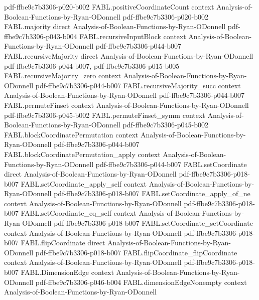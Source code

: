 \begin{theorem}
  {pdf-ffbe9c7b3306-p020-b002}
\proofstep
  {FABL.positiveCoordinateCount}
  {context}
  {Analysis-of-Boolean-Functions-by-Ryan-ODonnell}
  {pdf-ffbe9c7b3306-p020-b002}
\proofstep
  {FABL.majority}
  {direct}
  {Analysis-of-Boolean-Functions-by-Ryan-ODonnell}
  {pdf-ffbe9c7b3306-p043-b004}
\proofstep
  {FABL.recursiveInputBlock}
  {context}
  {Analysis-of-Boolean-Functions-by-Ryan-ODonnell}
  {pdf-ffbe9c7b3306-p044-b007}
\proofstep
  {FABL.recursiveMajority}
  {direct}
  {Analysis-of-Boolean-Functions-by-Ryan-ODonnell}
  {pdf-ffbe9c7b3306-p044-b007,
    pdf-ffbe9c7b3306-p015-b005}
\proofstep
  {FABL.recursiveMajority_zero}
  {context}
  {Analysis-of-Boolean-Functions-by-Ryan-ODonnell}
  {pdf-ffbe9c7b3306-p044-b007}
\proofstep
  {FABL.recursiveMajority_succ}
  {context}
  {Analysis-of-Boolean-Functions-by-Ryan-ODonnell}
  {pdf-ffbe9c7b3306-p044-b007}
\proofstep
  {FABL.permuteFinset}
  {context}
  {Analysis-of-Boolean-Functions-by-Ryan-ODonnell}
  {pdf-ffbe9c7b3306-p045-b002}
\proofstep
  {FABL.permuteFinset_symm}
  {context}
  {Analysis-of-Boolean-Functions-by-Ryan-ODonnell}
  {pdf-ffbe9c7b3306-p045-b002}
\proofstep
  {FABL.blockCoordinatePermutation}
  {context}
  {Analysis-of-Boolean-Functions-by-Ryan-ODonnell}
  {pdf-ffbe9c7b3306-p044-b007}
\proofstep
  {FABL.blockCoordinatePermutation_apply}
  {context}
  {Analysis-of-Boolean-Functions-by-Ryan-ODonnell}
  {pdf-ffbe9c7b3306-p044-b007}
\proofstep
  {FABL.setCoordinate}
  {direct}
  {Analysis-of-Boolean-Functions-by-Ryan-ODonnell}
  {pdf-ffbe9c7b3306-p018-b007}
\proofstep
  {FABL.setCoordinate_apply_self}
  {context}
  {Analysis-of-Boolean-Functions-by-Ryan-ODonnell}
  {pdf-ffbe9c7b3306-p018-b007}
\proofstep
  {FABL.setCoordinate_apply_of_ne}
  {context}
  {Analysis-of-Boolean-Functions-by-Ryan-ODonnell}
  {pdf-ffbe9c7b3306-p018-b007}
\proofstep
  {FABL.setCoordinate_eq_self}
  {context}
  {Analysis-of-Boolean-Functions-by-Ryan-ODonnell}
  {pdf-ffbe9c7b3306-p018-b007}
\proofstep
  {FABL.setCoordinate_setCoordinate}
  {context}
  {Analysis-of-Boolean-Functions-by-Ryan-ODonnell}
  {pdf-ffbe9c7b3306-p018-b007}
\proofstep
  {FABL.flipCoordinate}
  {direct}
  {Analysis-of-Boolean-Functions-by-Ryan-ODonnell}
  {pdf-ffbe9c7b3306-p018-b007}
\proofstep
  {FABL.flipCoordinate_flipCoordinate}
  {context}
  {Analysis-of-Boolean-Functions-by-Ryan-ODonnell}
  {pdf-ffbe9c7b3306-p018-b007}
\proofstep
  {FABL.DimensionEdge}
  {context}
  {Analysis-of-Boolean-Functions-by-Ryan-ODonnell}
  {pdf-ffbe9c7b3306-p046-b004}
\proofstep
  {FABL.dimensionEdgeNonempty}
  {context}
  {Analysis-of-Boolean-Functions-by-Ryan-ODonnell}

\end{theorem}
